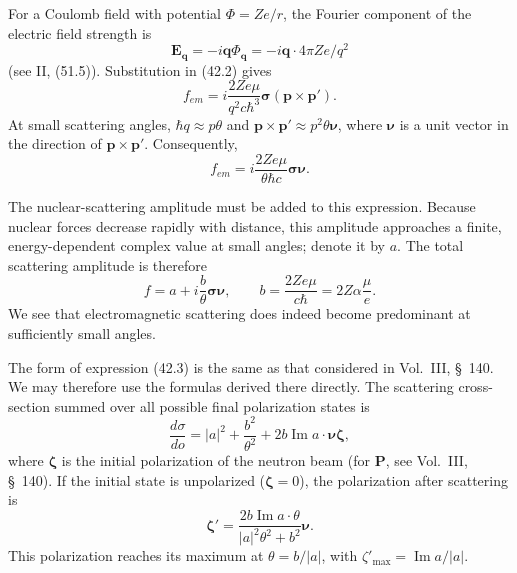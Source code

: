 For a Coulomb field with potential $\Phi=Ze/r$, the Fourier component of the electric field strength is
\[
\mathbf E_{\mathbf q}=-i\mathbf q\Phi_{\mathbf q}
=-i\mathbf q\cdot4\pi Ze/q^2
\]
(see II, (51.5)). Substitution in (42.2) gives
\[
f_{em}=i\frac{2Ze\mu}{q^2c\hbar^3}\boldsymbol\sigma(\mathbf p\times\mathbf p').
\]
At small scattering angles, $\hbar q\approx p\theta$ and $\mathbf p\times\mathbf p'\approx p^2\theta\boldsymbol\nu$, where $\boldsymbol\nu$ is a unit vector in the direction of $\mathbf p\times\mathbf p'$. Consequently,
\[
f_{em}=i\frac{2Ze\mu}{\theta\hbar c}\boldsymbol\sigma\boldsymbol\nu.
\]

The nuclear-scattering amplitude must be added to this expression. Because nuclear forces decrease rapidly with distance, this amplitude approaches a finite, energy-dependent complex value at small angles; denote it by $a$. The total scattering amplitude is therefore
\begin{equation}
f=a+i\frac b\theta\boldsymbol\sigma\boldsymbol\nu,
\qquad
b=\frac{2Ze\mu}{c\hbar}=2Z\alpha\frac\mu e.
\tag{42.3}
\end{equation}
We see that electromagnetic scattering does indeed become predominant at sufficiently small angles.

The form of expression (42.3) is the same as that considered in Vol.~III, \S~140. We may therefore use the formulas derived there directly. The scattering cross-section summed over all possible final polarization states is
\begin{equation}
\frac{d\sigma}{do}=|a|^2+\frac{b^2}{\theta^2}
+2b\operatorname{Im}a\cdot\boldsymbol\nu\boldsymbol\zeta,
\tag{42.4}
\end{equation}
where $\boldsymbol\zeta$ is the initial polarization of the neutron beam (for $\mathbf P$, see Vol.~III, \S~140). If the initial state is unpolarized ($\boldsymbol\zeta=0$), the polarization after scattering is
\begin{equation}
\boldsymbol\zeta'=\frac{2b\operatorname{Im}a\cdot\theta}
{|a|^2\theta^2+b^2}\boldsymbol\nu.
\tag{42.5}
\end{equation}
This polarization reaches its maximum at $\theta=b/|a|$, with $\zeta'_{\max}=\operatorname{Im}a/|a|$.
